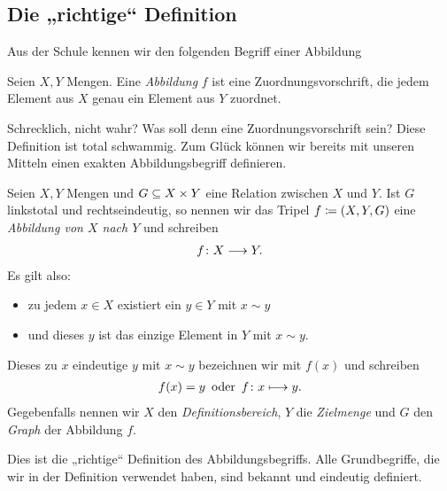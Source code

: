 
\subsection{Die „richtige“ Definition}


Aus der Schule kennen wir den folgenden Begriff einer Abbildung

\begin{definn}
  
  Seien $X,Y$ Mengen. Eine \emph{Abbildung} $f$ ist eine
  Zuordnungsvorschrift, die jedem Element aus $X$ genau ein Element aus $Y$
  zuordnet.

\end{definn}

Schrecklich, nicht wahr? Was soll denn eine Zuordnungsvorschrift sein?
Diese Definition ist total schwammig. Zum Glück können wir bereits mit
unseren Mitteln einen exakten Abbildungsbegriff definieren.

\begin{defin}

  Seien $X,Y$ Mengen und $G \subseteq X\times Y$ eine Relation zwischen $X$ und
  $Y$. Ist $G$ linkstotal und rechtseindeutig, so nennen wir das Tripel
  $f\coloneqq (X,Y,G)$ eine \emph{Abbildung von $X$ nach $Y$} und schreiben
  \begin{align*}
    f \colon X \longrightarrow Y.
  \end{align*}
  Es gilt also:
  \begin{itemize}
    \item zu jedem $x\in X$ existiert ein $y \in Y$ mit $x \sim y$
    \item und dieses $y$ ist das einzige Element in $Y$ mit $x \sim y$.
  \end{itemize}
  Dieses zu $x$ eindeutige $y$ mit $x\sim y$ bezeichnen wir mit
  $f(x)$ und schreiben
  \begin{align*}
    f(x) = y \,\text{ oder }\, f\colon x \longmapsto y.
  \end{align*}
  Gegebenfalls nennen wir $X$ den \emph{Definitionsbereich}, $Y$ die
  \emph{Zielmenge} und $G$ den \emph{Graph} der Abbildung $f$.
  
\end{defin}


Dies ist die „richtige“ Definition des Abbildungsbegriffs. Alle
Grundbegriffe, die wir in der Definition verwendet haben, sind bekannt und
eindeutig definiert.

